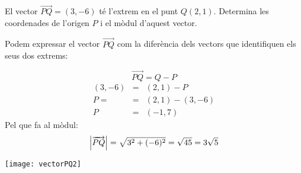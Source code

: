 \Exercise El vector $\overrightarrow{PQ}=(3,-6)$ té l'extrem en el punt $Q(2,1)$. Determina les coordenades de l'origen $P$ i el mòdul d'aquest vector.

\Answer

Podem expressar el vector $\overrightarrow{PQ}$ com la diferència dels vectors que identifiquen els seus dos extrems:

\begin{minipage}{0.49\linewidth}
\[\overrightarrow{PQ}=Q-P\]
\begin{eqnarray*}
  (3,-6)&=&(2,1)-P\\
  P=&=&(2,1)-(3,-6)\\
  P&=&(-1,7)
\end{eqnarray*}
Pel que fa al mòdul:
\[\abs{\overrightarrow{PQ}}=\sqrt{3^2+(-6)^2}=\sqrt{45}=3\sqrt{5}\]
\end{minipage}
\hspace{0.01\linewidth}
\begin{minipage}{0.49\linewidth}
\begin{center}
  \texttt{[image: vectorPQ2]}
\end{center}
\end{minipage}


\blacksquare 